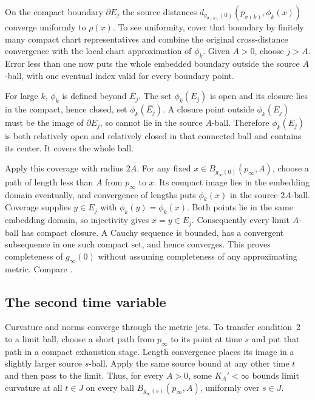 On the compact boundary $\partial E_j$ the source distances
$d_{g_{\sigma(k)}(0)}(p_{\sigma(k)},\phi_k(x))$ converge uniformly
to $\rho(x)$.  To see uniformity, cover that boundary by finitely
many compact chart representatives and combine the original
cross-distance convergence with the local chart approximation of
$\phi_k$.  Given $A>0$, choose $j>A$.  Error less than one now
puts the whole embedded boundary outside the source $A$-ball,
with one eventual index valid for every boundary point.

For large $k$, $\phi_k$ is defined beyond $\overline{E_j}$.
The set $\phi_k(E_j)$ is open and its closure lies in the compact,
hence closed, set $\phi_k(\overline{E_j})$.  A closure point outside
$\phi_k(E_j)$ must be the image of $\partial E_j$, so cannot lie
in the source $A$-ball.  Therefore $\phi_k(E_j)$ is both relatively
open and relatively closed in that connected ball and contains its
center.  It covers the whole ball.

Apply this coverage with radius $2A$.  For any fixed
$x\in B_{g_\infty(0)}(p_\infty,A)$, choose a path of length less
than $A$ from $p_\infty$ to $x$.  Its compact image lies in the
embedding domain eventually, and convergence of lengths puts
$\phi_k(x)$ in the source $2A$-ball.  Coverage supplies
$y\in E_j$ with $\phi_k(y)=\phi_k(x)$.  Both points lie in the
same embedding domain, so injectivity gives $x=y\in E_j$.
Consequently every limit $A$-ball has compact closure.  A Cauchy
sequence is bounded, has a convergent subsequence in one such compact
set, and hence converges.  This proves completeness of $g_\infty(0)$
without assuming completeness of any approximating metric.
Compare \cite[Theorems 5.9--5.11, pp.~88--90; Proposition 5.14,
pp.~90--91; Theorem 5.15, pp.~91--92]{MT2007}.

\subsection{The second time variable}

Curvature and norms converge through the metric jets.  To transfer
condition~2 to a limit ball, choose a short path from $p_\infty$ to
its point at time $s$ and put that path in a compact exhaustion
stage.  Length convergence places its image in a slightly larger
source $s$-ball.  Apply the same source bound at any other time $t$
and then pass to the limit.  Thus, for every $A>0$, some $K_A'<\infty$
bounds limit curvature at all $t\in J$ on every ball
$B_{g_\infty(s)}(p_\infty,A)$, uniformly over $s\in J$.

